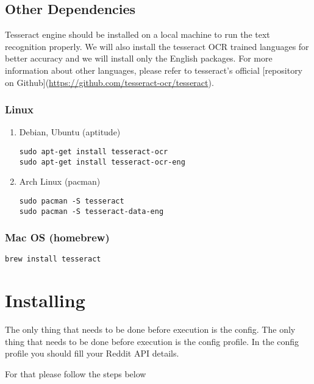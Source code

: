 \documentclass[11pt]{article}
\begin{document}
\subsection{Other Dependencies}
\label{sec-1-2}

Tesseract engine should be installed on a local machine to run the text
recognition properly. We will also install the tesseract OCR trained 
languages for better accuracy and we will install only the English 
packages. For more information about other languages, please refer to 
tesseract's official 
[repository on Github](\url{https://github.com/tesseract-ocr/tesseract}).

\subsubsection{Linux}
\label{sec-1-2-1}

\begin{enumerate}
\item Debian, Ubuntu (aptitude)
\label{sec-1-2-1-1}

\begin{verbatim}
sudo apt-get install tesseract-ocr
sudo apt-get install tesseract-ocr-eng
\end{verbatim}

\item Arch Linux (pacman)
\label{sec-1-2-1-2}

\begin{verbatim}
sudo pacman -S tesseract
sudo pacman -S tesseract-data-eng
\end{verbatim}
\end{enumerate}

\subsubsection{Mac OS (homebrew)}
\label{sec-1-2-2}
\begin{verbatim}
brew install tesseract
\end{verbatim}

\section{Installing}
\label{sec-2}

The only thing that needs to be done before execution is the config. The only
thing that needs to be done before execution is the config profile. In the
config profile you should fill your Reddit API details.

For that please follow the steps below
\end{document}
